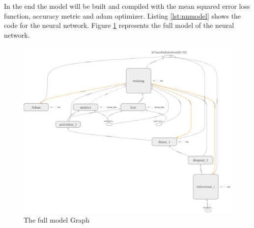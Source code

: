 In the end the model will be built and compiled with the mean  squared error loss function, accuracy metric and adam optimizer.
Listing \ref{lst:nnmodel} shows the code for the neural network. Figure \ref{fig:FullmodelGraph} represents the full model of the
neural network.
\begin{figure}[htp]
	\centering
	\includegraphics[width=1\textwidth]{Illustrations/tensorboardmodelofNN.png}
	\caption{The full model Graph}
	\label{fig:FullmodelGraph}
\end{figure}





